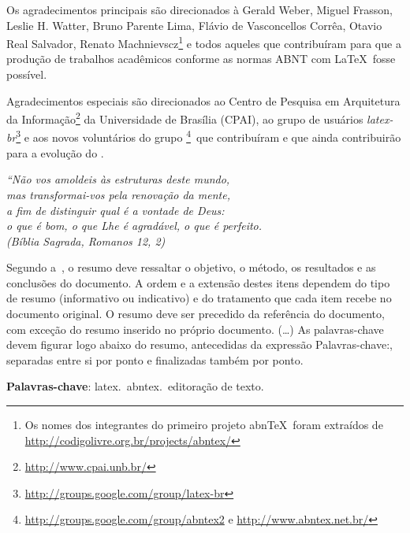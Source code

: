 \begin{agradecimentos}
Os agradecimentos principais são direcionados à Gerald Weber, Miguel Frasson,
Leslie H. Watter, Bruno Parente Lima, Flávio de Vasconcellos Corrêa, Otavio Real
Salvador, Renato Machnievscz\footnote{Os nomes dos integrantes do primeiro
  projeto abn\TeX\ foram extraídos de
  \url{http://codigolivre.org.br/projects/abntex/}} e todos aqueles que
contribuíram para que a produção de trabalhos acadêmicos conforme
as normas ABNT com \LaTeX\ fosse possível.

Agradecimentos especiais são direcionados ao Centro de Pesquisa em Arquitetura
da Informação\footnote{\url{http://www.cpai.unb.br/}} da Universidade de
Brasília (CPAI), ao grupo de usuários
\emph{latex-br}\footnote{\url{http://groups.google.com/group/latex-br}} e aos
novos voluntários do grupo
\emph{\abnTeX}\footnote{\url{http://groups.google.com/group/abntex2} e
  \url{http://www.abntex.net.br/}}~que contribuíram e que ainda
contribuirão para a evolução do \abnTeX.

\end{agradecimentos}

\begin{epigrafe}
\vspace*{\fill}
\begin{flushright}
  \textit{``Não vos amoldeis às estruturas deste mundo, \\
    mas transformai-vos pela renovação da mente, \\
    a fim de distinguir qual é a vontade de Deus: \\
    o que é bom, o que Lhe é agradável, o que é perfeito.\\
    (Bíblia Sagrada, Romanos 12, 2)}
\end{flushright}
\end{epigrafe}


\setlength{\absparsep}{18pt} %
\begin{resumo}
Segundo a~, o resumo deve ressaltar o
objetivo, o método, os resultados e as conclusões do documento. A ordem e a extensão
destes itens dependem do tipo de resumo (informativo ou indicativo) e do
tratamento que cada item recebe no documento original. O resumo deve ser
precedido da referência do documento, com exceção do resumo inserido no
próprio documento. (\ldots) As palavras-chave devem figurar logo abaixo do
resumo, antecedidas da expressão Palavras-chave:, separadas entre si por
ponto e finalizadas também por ponto.

\textbf{Palavras-chave}: latex.\ abntex.\ editoração de texto.
\end{resumo}

